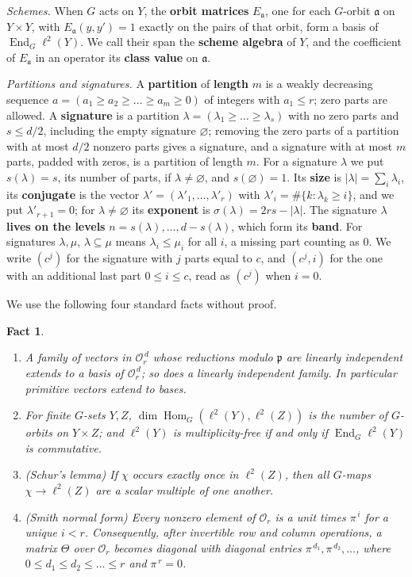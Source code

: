 \documentclass[11pt]{article}
\numberwithin{equation}{section}
\theoremstyle{plain}
\newtheorem{fact}[theorem]{Fact}
\theoremstyle{definition}
\begin{document}
\emph{Schemes.} When $G$ acts on $Y$, the \textbf{orbit matrices} $E_{\mathfrak{a}}$, one for each $G$-orbit
$\mathfrak{a}$ on $Y\times Y$, with $E_{\mathfrak{a}}(y,y')=1$ exactly on the pairs of that orbit, form a basis
of $\operatorname{End}_G\ell^2(Y)$. We call their span the \textbf{scheme algebra} of $Y$,
and the coefficient of $E_{\mathfrak{a}}$ in an operator its \textbf{class value} on $\mathfrak{a}$.

\emph{Partitions and signatures.} A \textbf{partition} of \textbf{length} $m$ is a weakly
decreasing sequence $a=(a_1\ge a_2\ge\dots\ge a_m\ge0)$ of integers with $a_1\le r$; zero
parts are allowed. A \textbf{signature} is a partition
$\lambda=(\lambda_1\ge\dots\ge\lambda_s)$ with no zero parts and $s\le d/2$, including the
empty signature $\varnothing$; removing the zero parts of a partition with at most $d/2$
nonzero parts gives a signature, and a signature with at most $m$ parts, padded with
zeros, is a partition of length $m$. For a signature $\lambda$ we put $s(\lambda)=s$, its
number of parts, if $\lambda\ne\varnothing$, and $s(\varnothing)=1$. Its \textbf{size} is
$|\lambda|=\sum_i\lambda_i$, its \textbf{conjugate} is the vector
$\lambda'=(\lambda'_1,\dots,\lambda'_r)$ with $\lambda'_i=\#\{k:\lambda_k\ge i\}$, and we
put $\lambda'_{r+1}=0$; for $\lambda\ne\varnothing$ its \textbf{exponent} is
$\sigma(\lambda)=2rs-|\lambda|$. The signature $\lambda$ \textbf{lives on the levels}
$n=s(\lambda),\dots,d-s(\lambda)$, which form its \textbf{band}. For signatures
$\lambda,\mu$, $\lambda\subseteq\mu$ means $\lambda_i\le\mu_i$ for all $i$, a missing
part counting as $0$. We write $(c^j)$ for the signature with $j$ parts equal to $c$, and
$(c^j,i)$ for the one with an additional last part $0\le i\le c$, read as $(c^j)$ when
$i=0$.

We use the following four standard facts without proof.

\begin{fact}\label{thm:2.1}
\begin{enumerate}
\item A family of vectors in $\mathcal{O}_r^{\,d}$ whose reductions modulo $\mathfrak{p}$ are
  linearly independent extends to a basis of $\mathcal{O}_r^{\,d}$; so does a linearly
  independent family. In particular primitive vectors extend to bases.
\item For finite $G$-sets $Y,Z$,
  $\dim\operatorname{Hom}_G(\ell^2(Y),\ell^2(Z))$ is the number of $G$-orbits on
  $Y\times Z$; and $\ell^2(Y)$ is multiplicity-free if and only if
  $\operatorname{End}_G\ell^2(Y)$ is commutative.
\item (Schur's lemma) If $\chi$ occurs exactly once in $\ell^2(Z)$, then all $G$-maps
  $\chi\to\ell^2(Z)$ are a scalar multiple of one another.
\item (Smith normal form) Every nonzero element of $\mathcal{O}_r$ is a unit times
  $\pi^{\,i}$ for a unique $i<r$. Consequently, after invertible row and column
  operations, a matrix $\Theta$ over $\mathcal{O}_r$ becomes diagonal with diagonal entries
  $\pi^{\,d_1},\pi^{\,d_2},\dots$, where $0\le d_1\le d_2\le\dots\le r$ and $\pi^{\,r}=0$.
\end{enumerate}
\end{fact}
\end{document}
